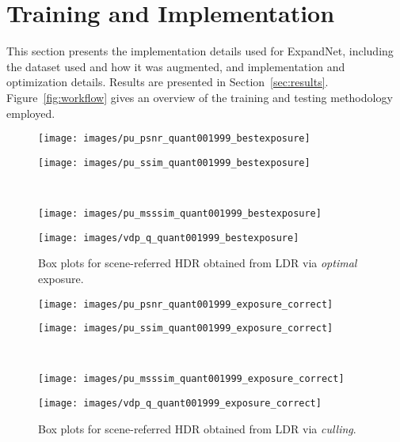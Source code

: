\documentclass{egpubl}
\begin{document}
\section{Training and Implementation}

This section presents the implementation details used for ExpandNet, including
the dataset used and how it was augmented, and implementation and optimization
details. Results are presented in Section~\ref{sec:results}.
Figure~\ref{fig:workflow} gives an overview of the training and testing
methodology employed.

\begin{figure}[t]
    \centering
    \begin{minipage}{0.48\linewidth}
        \centering
        \texttt{[image: images/pu\_psnr\_quant001999\_bestexposure]}
    \end{minipage}
    \begin{minipage}{0.48\linewidth}
        \centering
        \texttt{[image: images/pu\_ssim\_quant001999\_bestexposure]}
    \end{minipage}\\
    \begin{minipage}{0.48\linewidth}
        \centering
        \texttt{[image: images/pu\_msssim\_quant001999\_bestexposure]}
    \end{minipage}
    \begin{minipage}{0.48\linewidth}
        \centering
        \texttt{[image: images/vdp\_q\_quant001999\_bestexposure]}
    \end{minipage}
    \caption{Box plots for scene-referred HDR obtained from LDR via
    \textit{optimal} exposure.}\label{fig:boxplots_scene_optimal}
\end{figure}
\begin{figure}[t]
\centering
    \begin{minipage}{0.48\linewidth}
        \centering
\texttt{[image: images/pu\_psnr\_quant001999\_exposure\_correct]}
    \end{minipage}
    \begin{minipage}{0.48\linewidth}
        \centering
\texttt{[image: images/pu\_ssim\_quant001999\_exposure\_correct]}
    \end{minipage}\\
    \begin{minipage}{0.48\linewidth}
        \centering
\texttt{[image: images/pu\_msssim\_quant001999\_exposure\_correct]}
    \end{minipage}
    \begin{minipage}{0.48\linewidth}
        \centering
\texttt{[image: images/vdp\_q\_quant001999\_exposure\_correct]}
    \end{minipage}
    \caption{Box plots for scene-referred HDR obtained from LDR via
    \textit{culling}.}\label{fig:boxplots_scene_culling}
\end{figure}
\end{document}

